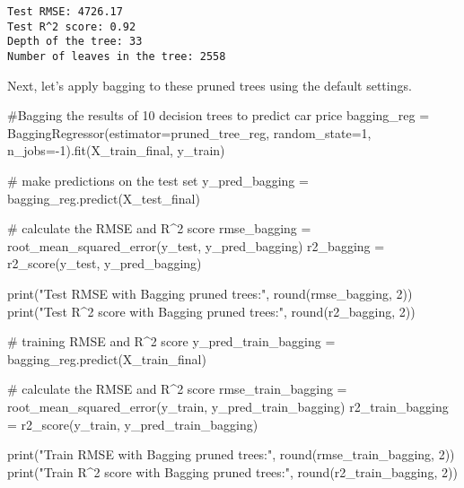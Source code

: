 \documentclass[
  letterpaper,
  DIV=11,
  numbers=noendperiod]{scrreprt}
\newenvironment{Shaded}{\begin{snugshade}}{\end{snugshade}}
\newcommand{\BuiltInTok}[1]{\textcolor[rgb]{0.00,0.23,0.31}{#1}}
\newcommand{\CommentTok}[1]{\textcolor[rgb]{0.37,0.37,0.37}{#1}}
\newcommand{\DecValTok}[1]{\textcolor[rgb]{0.68,0.00,0.00}{#1}}
\newcommand{\NormalTok}[1]{\textcolor[rgb]{0.00,0.23,0.31}{#1}}
\newcommand{\OperatorTok}[1]{\textcolor[rgb]{0.37,0.37,0.37}{#1}}
\newcommand{\StringTok}[1]{\textcolor[rgb]{0.13,0.47,0.30}{#1}}
\begin{document}
\begin{verbatim}
Test RMSE: 4726.17
Test R^2 score: 0.92
Depth of the tree: 33
Number of leaves in the tree: 2558
\end{verbatim}

Next, let's apply bagging to these pruned trees using the default
settings.

\begin{Shaded}
\begin{Highlighting}[]
\CommentTok{\#Bagging the results of 10 decision trees to predict car price}
\NormalTok{bagging\_reg }\OperatorTok{=}\NormalTok{ BaggingRegressor(estimator}\OperatorTok{=}\NormalTok{pruned\_tree\_reg, random\_state}\OperatorTok{=}\DecValTok{1}\NormalTok{,}
\NormalTok{                        n\_jobs}\OperatorTok{={-}}\DecValTok{1}\NormalTok{).fit(X\_train\_final, y\_train)}

\CommentTok{\# make predictions on the test set}
\NormalTok{y\_pred\_bagging }\OperatorTok{=}\NormalTok{ bagging\_reg.predict(X\_test\_final)}

\CommentTok{\# calculate the RMSE and R\^{}2 score}
\NormalTok{rmse\_bagging }\OperatorTok{=}\NormalTok{ root\_mean\_squared\_error(y\_test, y\_pred\_bagging)}
\NormalTok{r2\_bagging }\OperatorTok{=}\NormalTok{ r2\_score(y\_test, y\_pred\_bagging)}

\BuiltInTok{print}\NormalTok{(}\StringTok{"Test RMSE with Bagging pruned trees:"}\NormalTok{, }\BuiltInTok{round}\NormalTok{(rmse\_bagging, }\DecValTok{2}\NormalTok{))}
\BuiltInTok{print}\NormalTok{(}\StringTok{"Test R\^{}2 score with Bagging pruned trees:"}\NormalTok{, }\BuiltInTok{round}\NormalTok{(r2\_bagging, }\DecValTok{2}\NormalTok{))}


\CommentTok{\# training RMSE and R\^{}2 score}
\NormalTok{y\_pred\_train\_bagging }\OperatorTok{=}\NormalTok{ bagging\_reg.predict(X\_train\_final)}

\CommentTok{\# calculate the RMSE and R\^{}2 score}
\NormalTok{rmse\_train\_bagging }\OperatorTok{=}\NormalTok{ root\_mean\_squared\_error(y\_train, y\_pred\_train\_bagging)}
\NormalTok{r2\_train\_bagging }\OperatorTok{=}\NormalTok{ r2\_score(y\_train, y\_pred\_train\_bagging)}

\BuiltInTok{print}\NormalTok{(}\StringTok{"Train RMSE with Bagging pruned trees:"}\NormalTok{, }\BuiltInTok{round}\NormalTok{(rmse\_train\_bagging, }\DecValTok{2}\NormalTok{))}
\BuiltInTok{print}\NormalTok{(}\StringTok{"Train R\^{}2 score with Bagging pruned trees:"}\NormalTok{, }\BuiltInTok{round}\NormalTok{(r2\_train\_bagging, }\DecValTok{2}\NormalTok{))}
\end{Highlighting}
\end{Shaded}
\end{document}
